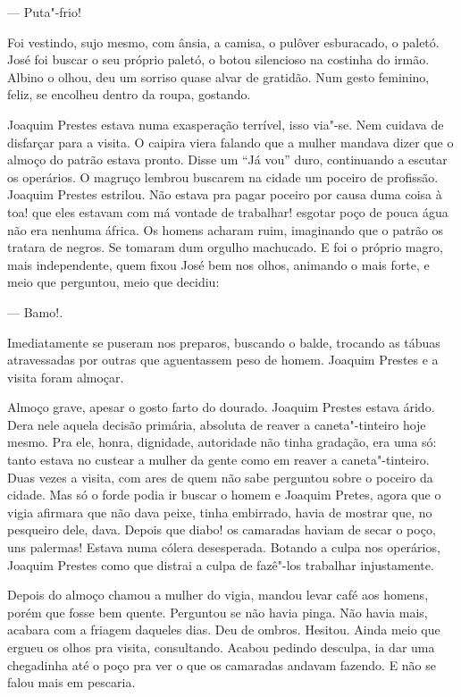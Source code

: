 \begin{linenumbers}
--- Puta"-frio!

Foi vestindo, sujo mesmo, com ânsia, a camisa, o pulôver esburacado, o
paletó. José foi buscar o seu próprio paletó, o botou silencioso na
costinha do irmão. Albino o olhou, deu um sorriso quase alvar de
gratidão. Num gesto feminino, feliz, se encolheu dentro da roupa,
gostando.

Joaquim Prestes estava numa exasperação terrível, isso via"-se. Nem
cuidava de disfarçar para a visita. O caipira viera falando que a mulher
mandava dizer que o almoço do patrão estava pronto. Disse um ``Já vou''
duro, continuando a escutar os operários. O magruço lembrou buscarem na
cidade um poceiro de profissão. Joaquim Prestes estrilou. Não estava pra
pagar poceiro por causa duma coisa à toa! que eles estavam com má
vontade de trabalhar! esgotar poço de pouca água não era nenhuma áfrica.
Os homens acharam ruim, imaginando que o patrão os tratara de negros. Se
tomaram dum orgulho machucado. E foi o próprio magro, mais independente,
quem fixou José bem nos olhos, animando o mais forte, e meio que
perguntou, meio que decidiu:

--- Bamo!.

Imediatamente se puseram nos preparos, buscando o balde, trocando as
tábuas atravessadas por outras que aguentassem peso de homem. Joaquim
Prestes e a visita foram almoçar.

Almoço grave, apesar o gosto farto do dourado. Joaquim Prestes estava
árido. Dera nele aquela decisão primária, absoluta de reaver a
caneta"-tinteiro hoje mesmo. Pra ele, honra, dignidade, autoridade não
tinha gradação, era uma só: tanto estava no custear a mulher da gente
como em reaver a caneta"-tinteiro. Duas vezes a visita, com ares de quem
não sabe perguntou sobre o poceiro da cidade. Mas só o forde podia ir
buscar o homem e Joaquim Pretes, agora que o vigia afirmara que não dava
peixe, tinha embirrado, havia de mostrar que, no pesqueiro dele, dava.
Depois que diabo! os camaradas haviam de secar o poço, uns palermas!
Estava numa cólera desesperada. Botando a culpa nos operários, Joaquim
Prestes como que distrai a culpa de fazê"-los trabalhar injustamente.

Depois do almoço chamou a mulher do vigia, mandou levar café aos homens,
porém que fosse bem quente. Perguntou se não havia pinga. Não havia
mais, acabara com a friagem daqueles dias. Deu de ombros. Hesitou. Ainda
meio que ergueu os olhos pra visita, consultando. Acabou pedindo
desculpa, ia dar uma chegadinha até o poço pra ver o que os camaradas
andavam fazendo. E não se falou mais em pescaria.


\end{linenumbers}

